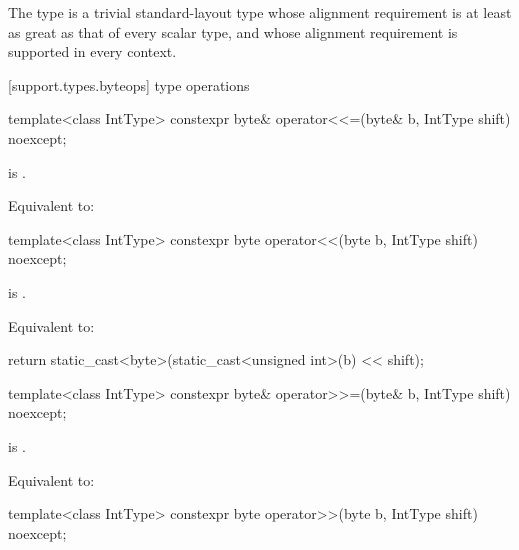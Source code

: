 \pnum
The type
%
 is a trivial standard-layout type whose alignment requirement
is at least as great as that of every scalar type, and whose alignment
requirement is supported in every context.


[support.types.byteops]{ type operations}

%
\begin{itemdecl}
template<class IntType>
  constexpr byte& operator<<=(byte& b, IntType shift) noexcept;
\end{itemdecl}

\begin{itemdescr}
\pnum
\constraints
{} is .

\pnum
\effects
Equivalent to:
\end{itemdescr}

%
\begin{itemdecl}
template<class IntType>
  constexpr byte operator<<(byte b, IntType shift) noexcept;
\end{itemdecl}

\begin{itemdescr}
\pnum
\constraints
{} is .

\pnum
\effects
Equivalent to:
\begin{codeblock}
return static_cast<byte>(static_cast<unsigned int>(b) << shift);
\end{codeblock}
\end{itemdescr}

%
\begin{itemdecl}
template<class IntType>
  constexpr byte& operator>>=(byte& b, IntType shift) noexcept;
\end{itemdecl}

\begin{itemdescr}
\pnum
\constraints
{} is .

\pnum
\effects
Equivalent to:
\end{itemdescr}

%
\begin{itemdecl}
template<class IntType>
  constexpr byte operator>>(byte b, IntType shift) noexcept;
\end{itemdecl}

